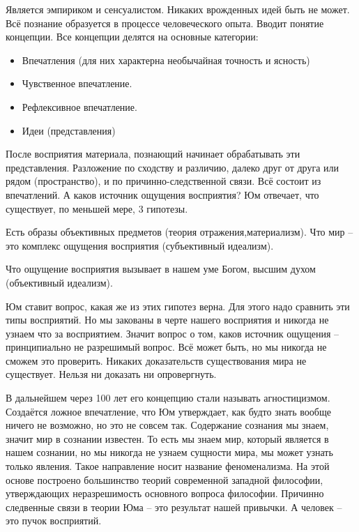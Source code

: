Является эмпириком и сенсуалистом. Никаких врожденных идей быть не может. Всё познание образуется в процессе человеческого опыта. Вводит понятие концепции. Все концепции делятся на основные категории:

\begin{itemize}
    \item Впечатления (для них характерна необычайная точность и ясность)
    \item Чувственное впечатление.
    \item Рефлексивное впечатление.
    \item Идеи (представления)
\end{itemize}

После восприятия материала, познающий начинает обрабатывать эти представления. Разложение по сходству и различию, далеко друг от друга или рядом (пространство), и по причинно-следственной связи. Всё состоит из впечатлений. А каков источник ощущения восприятия? Юм отвечает, что существует, по меньшей мере, 3 гипотезы.

    Есть образы объективных предметов (теория отражения,материализм).
    Что мир – это комплекс ощущения восприятия (субъективный идеализм).

    Что ощущение восприятия вызывает в нашем уме Богом, высшим духом (объективный идеализм).

    Юм ставит вопрос, какая же из этих гипотез верна. Для этого надо сравнить эти типы восприятий. Но мы закованы в черте нашего восприятия и никогда не узнаем что за восприятием. Значит вопрос о том, каков источник ощущения – принципиально не разрешимый вопрос. Всё может быть, но мы никогда не сможем это проверить. Никаких доказательств существования мира не существует. Нельзя ни доказать ни опровергнуть.

В дальнейшем через 100 лет его концепцию стали называть агностицизмом. Создаётся ложное впечатление, что Юм утверждает, как будто знать вообще ничего не возможно, но это не совсем так. Содержание сознания мы знаем, значит мир в сознании известен. То есть мы знаем мир, который является в нашем сознании, но мы никогда не узнаем сущности мира, мы может узнать только явления. Такое направление носит название феноменализма. На этой основе построено большинство теорий современной западной философии, утверждающих неразрешимость основного вопроса философии. Причинно следвенные связи в теории Юма – это результат нашей привычки. А человек – это пучок восприятий.
